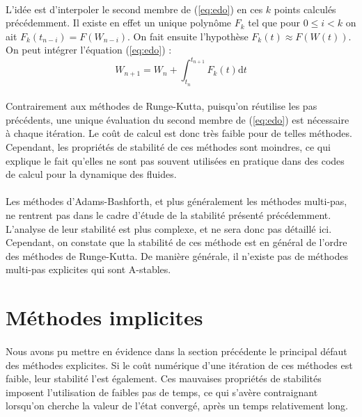     \paragraph{}
    L'idée est d'interpoler le second membre de (\ref{eq:edo}) en ces $k$ points calculés précédemment.
    Il existe en effet un unique polynôme $F_k$ tel que pour $0 \leq i < k$ on ait $F_k\left(t_{n-i}\right) = F\left(W_{n-i}\right)$.
    On fait ensuite l'hypothèse $F_k\left(t\right) \approx F\left(W\left(t\right)\right)$.
    On peut intégrer l'équation (\ref{eq:edo}) :
    \[W_{n+1} = W_n + \int_{t_n}^{t_{n+1}}F_k\left(t\right)\mathrm{d}t\]

    \paragraph{}
    Contrairement aux méthodes de Runge-Kutta, puisqu'on réutilise les pas précédents, une unique évaluation du second membre de (\ref{eq:edo}) est nécessaire à chaque itération.
    Le coût de calcul est donc très faible pour de telles méthodes.
    Cependant, les propriétés de stabilité de ces méthodes sont moindres, ce qui explique le fait qu'elles ne sont pas souvent utilisées en pratique dans des codes de calcul pour la dynamique des fluides.

    \paragraph{}
    Les méthodes d'Adams-Bashforth, et plus généralement les méthodes multi-pas, ne rentrent pas dans le cadre d'étude de la stabilité présenté précédemment.
    L'analyse de leur stabilité est plus complexe, \cite{HairerWanner1996}  et ne sera donc pas détaillé ici.
    Cependant, on constate que la stabilité de ces méthode est en général de l'ordre des méthodes de Runge-Kutta.
    De manière générale, il n'existe pas de méthodes multi-pas explicites qui sont A-stables.


\section{Méthodes implicites}

  \paragraph{}
  Nous avons pu mettre en évidence dans la section précédente le principal défaut des méthodes explicites.
  Si le coût numérique d'une itération de ces méthodes est faible, leur stabilité l'est également.
  Ces mauvaises propriétés de stabilités imposent l'utilisation de faibles pas de temps, ce qui s'avère contraignant lorsqu'on cherche la valeur de l'état convergé, après un temps relativement long.

